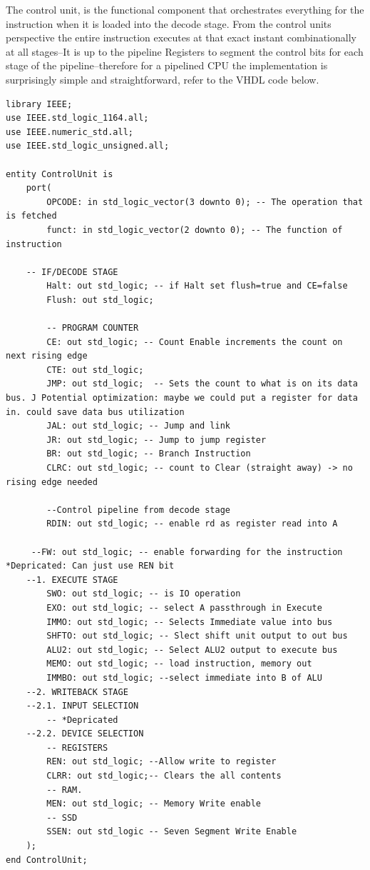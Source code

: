 \documentclass{article}
\begin{document}
The control unit, is the functional component that orchestrates everything for the instruction when it is loaded into the decode stage. From the control units perspective the entire instruction executes at that exact instant combinationally at all stages--It is up to the pipeline Registers to segment the control bits for each stage of the pipeline--therefore for a pipelined CPU the implementation is surprisingly simple and straightforward, refer to the VHDL code below.


\begin{verbatim}
library IEEE;
use IEEE.std_logic_1164.all;
use IEEE.numeric_std.all;
use IEEE.std_logic_unsigned.all;

entity ControlUnit is 
	port(
		OPCODE: in std_logic_vector(3 downto 0); -- The operation that is fetched
		funct: in std_logic_vector(2 downto 0); -- The function of instruction
		
	-- IF/DECODE STAGE
		Halt: out std_logic; -- if Halt set flush=true and CE=false
		Flush: out std_logic;
		
		-- PROGRAM COUNTER
		CE: out std_logic; -- Count Enable increments the count on next rising edge
		CTE: out std_logic;
		JMP: out std_logic;  -- Sets the count to what is on its data bus. J Potential optimization: maybe we could put a register for data in. could save data bus utilization
		JAL: out std_logic; -- Jump and link
		JR: out std_logic; -- Jump to jump register
		BR: out std_logic; -- Branch Instruction
		CLRC: out std_logic; -- count to Clear (straight away) -> no rising edge needed
		
		--Control pipeline from decode stage
		RDIN: out std_logic; -- enable rd as register read into A
		
	 --FW: out std_logic; -- enable forwarding for the instruction *Depricated: Can just use REN bit
	--1. EXECUTE STAGE
		SWO: out std_logic; -- is IO operation
		EXO: out std_logic; -- select A passthrough in Execute
		IMMO: out std_logic; -- Selects Immediate value into bus
		SHFTO: out std_logic; -- Slect shift unit output to out bus
		ALU2: out std_logic; -- Select ALU2 output to execute bus
		MEMO: out std_logic; -- load instruction, memory out
		IMMBO: out std_logic; --select immediate into B of ALU
	--2. WRITEBACK STAGE
	--2.1. INPUT SELECTION
		-- *Depricated
	--2.2. DEVICE SELECTION
		-- REGISTERS
		REN: out std_logic; --Allow write to register
		CLRR: out std_logic;-- Clears the all contents
		-- RAM. 
		MEN: out std_logic; -- Memory Write enable
		-- SSD
		SSEN: out std_logic -- Seven Segment Write Enable
	);
end ControlUnit;


\end{verbatim}
\end{document}
